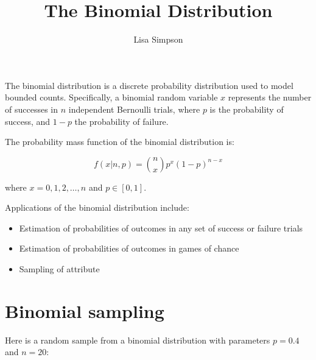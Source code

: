 \documentclass[11pt]{article}  %
\title{The Binomial Distribution}
\author{Lisa Simpson}
\begin{document}

\maketitle %

The binomial distribution is a discrete probability distribution used to
model bounded counts. Specifically, a binomial random variable $x$ represents
the number of successes in $n$ independent Bernoulli trials, where $p$ is
the probability of success, and $1-p$ the probability of failure.


The probability mass function of the binomial distribution is:

\begin{equation}
	f(x | n,p) = {n \choose x} p^x (1-p)^{n-x} %
\end{equation}

\noindent where $x = 0,1,2,\ldots,n$ and $p \in [0,1]$.

Applications of the binomial distribution include:

\begin{itemize} %

	\item Estimation of probabilities of outcomes in any set of success or failure trials

	\item Estimation of probabilities of outcomes in games of chance

	\item Sampling of attribute

\end{itemize}

\section{Binomial sampling}

Here is a random sample from a binomial distribution with parameters $p=0.4$ and $n=20$:
\end{document}
